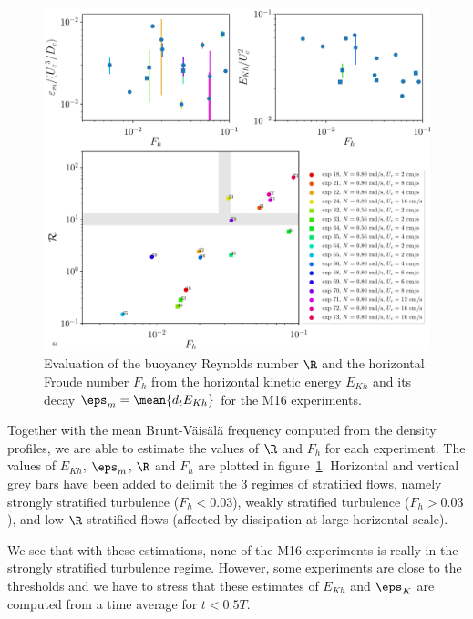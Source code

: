 \begin{figure}[htp!]
\centering
\includegraphics[width=\figwidth]{tmp/fig_R_vs_Fh}%

\caption{Evaluation of the buoyancy Reynolds number $\R$ and the horizontal
Froude number $F_h$ from the horizontal kinetic energy $E_{Kh}$ and its decay
$\eps_m = \mean{d_t E_{Kh}}$ for the M16 experiments.}%
\label{fig:RvsFh}

\end{figure}

Together with the mean Brunt-V\"ais\"al\"a frequency computed from the density
profiles, we are able to estimate the values of $\R$ and $F_h$ for each
experiment. The values of $E_{Kh}$, $\eps_m$, $\R$ and $F_h$ are plotted in
figure~\ref{fig:RvsFh}. Horizontal and vertical grey bars have been added to
delimit the 3 regimes of stratified flows, namely strongly stratified
turbulence ($F_h < 0.03$), weakly stratified turbulence ($F_h > 0.03$), and
low-$\R$ stratified flows (affected by dissipation at large horizontal scale).

We see that with these estimations, none of the M16 experiments is really in
the strongly stratified turbulence regime. However, some experiments are close to
the thresholds and we have to stress that these estimates of $E_{Kh}$ and
$\eps_K$ are computed from a time average for $t < 0.5 T$.

